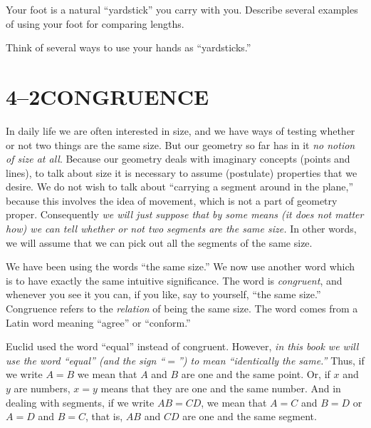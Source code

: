 \documentclass[11pt]{book}
\begin{document}

\begin{exercisecols}
\begin{exlist}
\item Your foot is a natural ``yardstick'' you carry with you. Describe several
      examples of using your foot for comparing lengths.
\item Think of several ways to use your hands as ``yardsticks.''
\end{exlist}
\end{exercisecols}

\section*{4--2\quad CONGRUENCE}

In daily life we are often interested in size, and we have ways of testing
whether or not two things are the same size. But our geometry so far has in it
\emph{no notion of size at all}. Because our geometry deals with imaginary
concepts (points and lines), to talk about size it is necessary to assume
(postulate) properties that we desire. We do not wish to talk about ``carrying a
segment around in the plane,'' because this involves the idea of movement, which
is not a part of geometry proper. Consequently \emph{we will just suppose that by
some means (it does not matter how) we can tell whether or not two segments are
the same size.} In other words, we will assume that we can pick out all the
segments of the same size.

We have been using the words ``the same size.'' We now use another word which is
to have exactly the same intuitive significance. The word is \emph{congruent},
and whenever you see it you can, if you like, say to yourself, ``the same size.''
Congruence refers to the \emph{relation} of being the same size. The word comes
from a Latin word meaning ``agree'' or ``conform.''

Euclid used the word ``equal'' instead of congruent. However, \emph{in this book
we will use the word ``equal'' (and the sign ``$=$'') to mean ``identically the
same.''} Thus, if we write $A = B$ we mean that $A$ and $B$ are one and the same
point. Or, if $x$ and $y$ are numbers, $x = y$ means that they are one and the
same number. And in dealing with segments, if we write $AB = CD$, we mean that
$A = C$ and $B = D$ or $A = D$ and $B = C$, that is, $AB$ and $CD$ are one and
the same segment.
\end{document}
